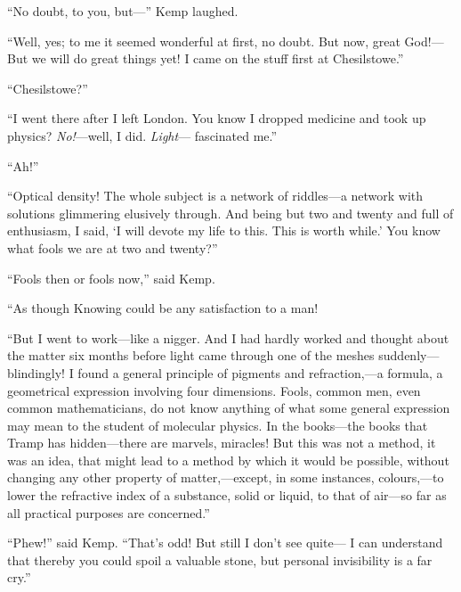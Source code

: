“No doubt, to you, but—” Kemp laughed.

“Well, yes; to me it seemed wonderful at first, no doubt. But now, great God!— But we will do great things yet! I came on the stuff first at Chesilstowe.”

“Chesilstowe?”

“I went there after I left London. You know I dropped medicine and took up physics? \emph{No!}—well, I did. \emph{Light}— fascinated me.”

“Ah!”

“Optical density! The whole subject is a network of riddles—a network with solutions glimmering elusively through. And being but two and twenty and full of enthusiasm, I said, ‘I will devote my life to this. This is worth while.’ You know what fools we are at two and twenty?”

“Fools then or fools now,” said Kemp.

“As though Knowing could be any satisfaction to a man!

“But I went to work—like a nigger. And I had hardly worked and thought about the matter six months before light came through one of the meshes suddenly—blindingly! I found a general principle of pigments and refraction,—a formula, a geometrical expression involving four dimensions. Fools, common men, even common mathematicians, do not know anything of what some general expression may mean to the student of molecular physics. In the books—the books that Tramp has hidden—there are marvels, miracles! But this was not a method, it was an idea, that might lead to a method by which it would be possible, without changing any other property of matter,—except, in some instances, colours,—to lower the refractive index of a substance, solid or liquid, to that of air—so far as all practical purposes are concerned.”

“Phew!” said Kemp. “That’s odd! But still I don’t see quite— I can understand that thereby you could spoil a valuable stone, but personal invisibility is a far cry.”

